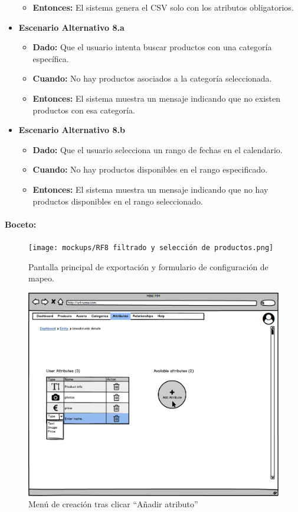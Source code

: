 \begin{itemize}
\begin{itemize}
        \item \textbf{Entonces:} El sistema genera el CSV solo con los atributos obligatorios.
    \end{itemize}
    \item \textbf{Escenario Alternativo 8.a}
    \begin{itemize}
        \item \textbf{Dado:} Que el usuario intenta buscar productos con una categoría específica.
        \item \textbf{Cuando:} No hay productos asociados a la categoría seleccionada.
        \item \textbf{Entonces:} El sistema muestra un mensaje indicando que no existen productos con esa categoría.
    \end{itemize}
    \item \textbf{Escenario Alternativo 8.b}
    \begin{itemize}
        \item \textbf{Dado:} Que el usuario selecciona un rango de fechas en el calendario.
        \item \textbf{Cuando:} No hay productos disponibles en el rango especificado.
        \item \textbf{Entonces:} El sistema muestra un mensaje indicando que no hay productos disponibles en el rango seleccionado.
    \end{itemize}
\end{itemize}
\paragraph{Boceto:}
\begin{figure}[H]
    \texttt{[image: mockups/RF8 filtrado y selección de productos.png]}
    \caption{Pantalla principal de exportación y formulario de configuración de mapeo.}
\end{figure}


\begin{figure}[H]
    \includegraphics[width=1\linewidth]{mockups/RF6.1Crear_Atributo tras Clickar.png}
    \caption{Menú de creación tras clicar \enquote{Añadir atributo}}
   \end{figure}
\vspace{1.0cm}

\newpage %